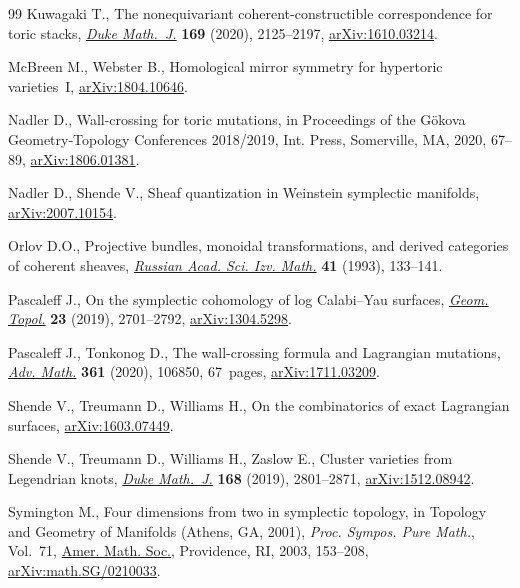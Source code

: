 \documentclass[10pt,a4paper]{amsart}
\numberwithin{equation}{section}
\begin{document}
\begin{thebibliography}{99}
Kuwagaki T., The nonequivariant coherent-constructible correspondence for toric
 stacks, \href{https://doi.org/10.1215/00127094-2020-0011}{\textit{Duke Math.~J.}} \textbf{169} (2020), 2125--2197,
 \href{https://arxiv.org/abs/1610.03214}{arXiv:1610.03214}.

McBreen M., Webster B., Homological mirror symmetry for hypertoric
 varieties~{I}, \href{https://arxiv.org/abs/1804.10646}{arXiv:1804.10646}.

Nadler D., Wall-crossing for toric mutations, in Proceedings of the {G}\"okova
 {G}eometry-{T}opology {C}onferences 2018/2019, Int. Press, Somerville, MA,
 2020, 67--89, \href{https://arxiv.org/abs/1806.01381}{arXiv:1806.01381}.

Nadler D., Shende V., Sheaf quantization in {W}einstein symplectic manifolds,
 \href{https://arxiv.org/abs/2007.10154}{arXiv:2007.10154}.

Orlov D.O., Projective bundles, monoidal transformations, and derived
 categories of coherent sheaves, \href{https://doi.org/10.1070/IM1993v041n01ABEH002182}{\textit{Russian Acad. Sci. Izv. Math.}}
 \textbf{41} (1993), 133--141.

Pascaleff J., On the symplectic cohomology of log {C}alabi--{Y}au surfaces,
 \href{https://doi.org/10.2140/gt.2019.23.2701}{\textit{Geom. Topol.}} \textbf{23} (2019), 2701--2792, \href{https://arxiv.org/abs/1304.5298}{arXiv:1304.5298}.

Pascaleff J., Tonkonog D., The wall-crossing formula and {L}agrangian
 mutations, \href{https://doi.org/10.1016/j.aim.2019.106850}{\textit{Adv. Math.}} \textbf{361} (2020), 106850, 67~pages,
 \href{https://arxiv.org/abs/1711.03209}{arXiv:1711.03209}.

Shende V., Treumann D., Williams H., On the combinatorics of exact {L}agrangian
 surfaces, \href{https://arxiv.org/abs/1603.07449}{arXiv:1603.07449}.

Shende V., Treumann D., Williams H., Zaslow E., Cluster varieties from
 {L}egendrian knots, \href{https://doi.org/10.1215/00127094-2019-0027}{\textit{Duke Math.~J.}} \textbf{168} (2019), 2801--2871,
 \href{https://arxiv.org/abs/1512.08942}{arXiv:1512.08942}.

Symington M., Four dimensions from two in symplectic topology, in Topology and
 Geometry of Manifolds ({A}thens, {GA}, 2001), \textit{Proc. Sympos. Pure
 Math.}, Vol.~71, \href{https://doi.org/10.1090/pspum/071/2024634}{Amer. Math. Soc.}, Providence, RI, 2003, 153--208,
 \href{https://arxiv.org/abs/math.SG/0210033}{arXiv:math.SG/0210033}.


\end{thebibliography}
\end{document}
